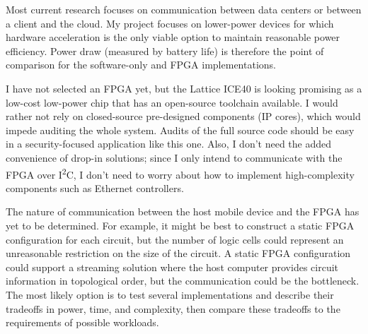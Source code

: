 \documentclass[letterpaper]{article}
\begin{document}
Most current research focuses on communication between data centers or between a client and the cloud. My project focuses on lower-power devices for which hardware acceleration is the only viable option to maintain reasonable power efficiency. Power draw (measured by battery life) is therefore the point of comparison for the software-only and FPGA implementations.

I have not selected an FPGA yet, but the Lattice ICE40 is looking promising as a low-cost low-power chip that has an open-source toolchain available. I would rather not rely on closed-source pre-designed components (IP cores), which would impede auditing the whole system. Audits of the full source code should be easy in a security-focused application like this one. Also, I don't need the added convenience of drop-in solutions; since I only intend to communicate with the FPGA over I\textsuperscript{2}C, I don't need to worry about how to implement high-complexity components such as Ethernet controllers.

The nature of communication between the host mobile device and the FPGA has yet to be determined. For example, it might be best to construct a static FPGA configuration for each circuit, but the number of logic cells could represent an unreasonable restriction on the size of the circuit. A static FPGA configuration could support a streaming solution where the host computer provides circuit information in topological order, but the communication could be the bottleneck. The most likely option is to test several implementations and describe their tradeoffs in power, time, and complexity, then compare these tradeoffs to the requirements of possible workloads.
\end{document}
